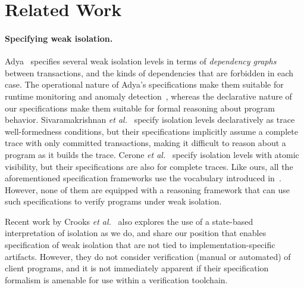 \vspace*{-6pt}
\section{Related Work}
\label{sec:relatedwork}

\paragraph{Specifying weak isolation.}
Adya~\cite{adyaphd} specifies several weak isolation levels in terms
of \emph{dependency graphs} between transactions, and the kinds of
dependencies that are forbidden in each case. The operational nature
of Adya's specifications make them suitable for runtime monitoring and
anomaly detection~\cite{kemmevldb,feketesigmod08,pssi2011}, whereas
the declarative nature of our specifications make them suitable for
formal reasoning about program behavior. Sivaramakrishnan \emph{et
al.}~\cite{pldi15} specify isolation levels declaratively as trace
well-formedness conditions, but their specifications implicitly assume
a complete trace with only committed transactions, making it difficult
to reason about a program as it builds the trace. Cerone \emph{et
al.}~\cite{gotsmanconcur15} specify isolation levels with atomic
visibility, but their specifications are also for complete traces.
Like ours, all the aforementioned specification frameworks use the
vocabulary introduced in~\cite{burckhardt14}. However, none of them
are equipped with a reasoning framework that can use such
specifications to verify programs under weak isolation.

Recent work by Crooks \emph{et al.}~\cite{CPA+17} also explores the
use of a state-based interpretation of isolation as we do, and share
our position that enables specification of weak isolation that are not
tied to implementation-specific artifacts.  However, they do not
consider verification (manual or automated) of client programs, and it
is not immediately apparent if their specification formalism is
amenable for use within a verification toolchain. 

\vspace*{-4pt}
